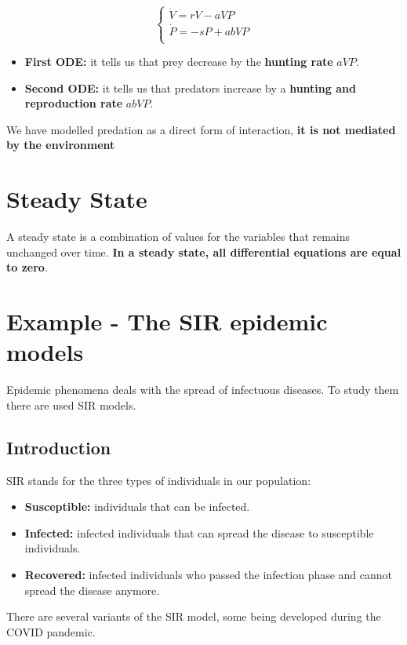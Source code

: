 \[
\begin{cases}
        \dot{V} = rV - aVP \\
        \dot{P} = - sP + abVP\\
\end{cases}
\]

\begin{itemize}
    \item \textbf{First ODE:} it tells us that prey decrease by the \textbf{hunting rate} $aVP$.
    \item \textbf{Second ODE:} it tells us that predators increase by a \textbf{hunting and reproduction rate} $abVP$.
\end{itemize}

We have modelled predation as a direct form of interaction, \textbf{it is not mediated by the environment}

\section{Steady State}
A steady state is a combination of values for the variables that remains unchanged over time. \textbf{In a steady state, all differential equations are equal to zero}.

\section{Example - The SIR epidemic models}
Epidemic phenomena deals with the spread of infectuous diseases. To study them there are used SIR models. 

\subsection{Introduction}
SIR stands for the three types of individuals in our population:

\begin{itemize}
    \item \textbf{Susceptible:} individuals that can be infected.
    \item \textbf{Infected:} infected individuals that can spread the disease to susceptible individuals.
    \item \textbf{Recovered:} infected individuals who passed the infection phase and cannot spread the disease anymore.
\end{itemize}

There are several variants of the SIR model, some being developed during the COVID pandemic.

